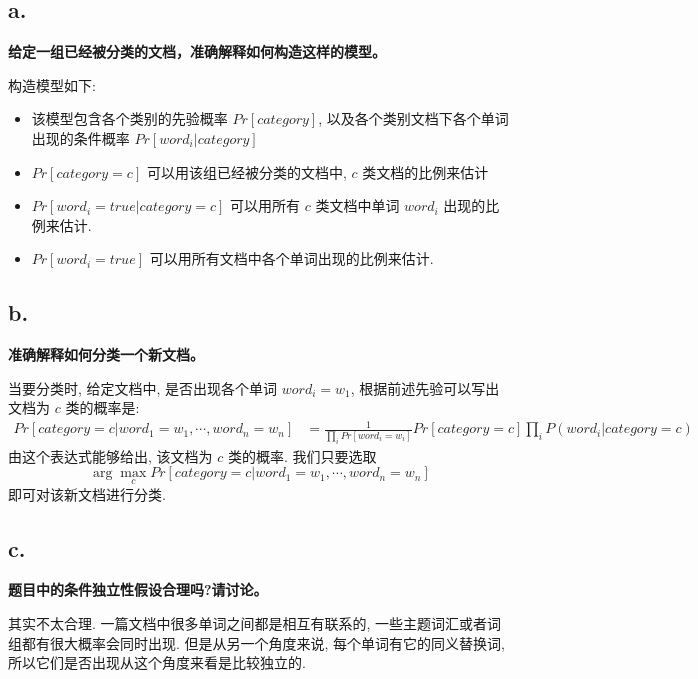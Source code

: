 \documentclass[UTF8]{article}
\newcommand{\jumpLine} {\hspace*{\fill} \par}
\begin{document}
\subsection*{a.}
\noindent \textbf{给定一组已经被分类的文档，准确解释如何构造这样的模型。} \\\jumpLine\noindent
构造模型如下:
\begin{itemize}
	\item 该模型包含各个类别的先验概率 $Pr[category]$, 以及各个类别文档下各个单词出现的条件概率 $Pr[word_i | category]$
	\item $Pr[category=c]$ 可以用该组已经被分类的文档中, $c$ 类文档的比例来估计
	\item $Pr[word_i =true| category=c]$ 可以用所有 $c$ 类文档中单词 $word_i$ 出现的比例来估计.
	\item $Pr[word_i=true]$ 可以用所有文档中各个单词出现的比例来估计.
\end{itemize}
\subsection*{b.}
\noindent \textbf{准确解释如何分类一个新文档。} \\\jumpLine\noindent
当要分类时, 给定文档中, 是否出现各个单词 $word_i=w_1$, 根据前述先验可以写出文档为 $c$ 类的概率是:
\begin{align*}
	Pr[category=c|word_1=w_1,\cdots,word_n=w_n] &=\frac{1}{\prod_{i}Pr[word_i=w_i]}Pr[category=c]\prod_{i}P(word_i|category=c)
\end{align*}
由这个表达式能够给出, 该文档为 $c$ 类的概率. 我们只要选取 $$\arg\max\limits_{c}Pr[category=c|word_1=w_1,\cdots,word_n=w_n]$$
即可对该新文档进行分类.
\subsection*{c.}
\noindent \textbf{题目中的条件独立性假设合理吗?请讨论。} \\\jumpLine\noindent
其实不太合理. 一篇文档中很多单词之间都是相互有联系的, 一些主题词汇或者词组都有很大概率会同时出现. 但是从另一个角度来说, 每个单词有它的同义替换词, 所以它们是否出现从这个角度来看是比较独立的.
\end{document}
